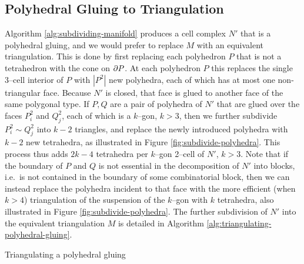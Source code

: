 
\subsection{Polyhedral Gluing to Triangulation}

Algorithm \ref{alg:subdividing-manifold} produces a cell complex $N'$ that is a polyhedral gluing, and we would prefer to replace $M$ with an equivalent triangulation.
This is done by first replacing each polyhedron $P$ that is not a tetrahedron with the cone on $\partial P$.
At each polyhedron $P$ this replaces the single 3--cell interior of $P$ with $|P^2|$ new polyhedra, each of which has at most one non-triangular face.
Because $N'$ is closed, that face is glued to another face of the same polygonal type.
If $P,Q$ are a pair of polyhedra of $N'$ that are glued over the faces $P_i^2$ and $Q_j^2$, each of which is a $k$--gon, $k>3$, then we further subdivide $P_i^2\sim Q_j^2$ into $k-2$ triangles, and replace the newly introduced polyhedra with $k-2$ new tetrahedra, as illustrated in Figure \ref{fig:subdivide-polyhedra}.
This process thus adds $2k-4$ tetrahedra per $k$--gon 2--cell of $N'$, $k>3$.
Note that if the boundary of $P$ and $Q$ is not essential in the decomposition of $N'$ into blocks, i.e.\ is not contained in the boundary of some combinatorial block, then we can instead replace the polyhedra incident to that face with the more efficient (when $k>4$) triangulation of the suspension of the $k$--gon with $k$ tetrahedra, also illustrated in Figure \ref{fig:subdivide-polyhedra}.
The further subdivision of $N'$ into the equivalent triangulation $M$ is detailed in Algorithm \ref{alg:triangulating-polyhedral-gluing}.

\begin{algorithm}[h!]
	\caption{Triangulating a polyhedral gluing}
	\label{alg:triangulating-polyhedral-gluing}
\end{algorithm}

